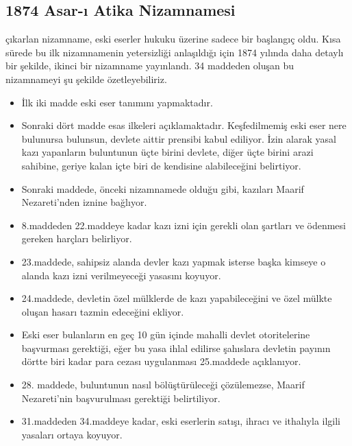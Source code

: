 \subsection{1874 Asar-ı Atika Nizamnamesi}
\indent{} çıkarlan nizamname, eski eserler hukuku üzerine sadece bir başlangıç oldu. Kısa sürede bu ilk nizamnamenin yetersizliği anlaşıldığı için 1874 yılında daha detaylı bir şekilde, ikinci bir nizamname yayınlandı. 34 maddeden oluşan bu nizamnameyi şu şekilde özetleyebiliriz.\cite{mumcu_2}
\begin{itemize}
    \item İlk iki madde eski eser tanımını yapmaktadır.
    \item Sonraki dört madde esas ilkeleri açıklamaktadır. Keşfedilmemiş eski eser nere bulunursa bulunsun, devlete aittir prensibi kabul ediliyor. İzin alarak yasal kazı yapanların buluntunun üçte birini devlete, diğer üçte birini arazi sahibine, geriye kalan içte biri de kendisine alabileceğini belirtiyor.
    \item Sonraki maddede, önceki nizamnamede olduğu gibi, kazıları Maarif Nezareti'nden iznine bağlıyor.
    \item 8.maddeden 22.maddeye kadar kazı izni için gerekli olan şartları ve ödenmesi gereken harçları belirliyor.
    \item 23.maddede, sahipsiz alanda devler kazı yapmak isterse başka kimseye o alanda kazı izni verilmeyeceği yasasını koyuyor.
    \item 24.maddede, devletin özel mülklerde de kazı yapabileceğini ve özel mülkte oluşan hasarı tazmin edeceğini ekliyor.
    \item Eski eser bulanların en geç 10 gün içinde mahalli devlet otoritelerine başvurması gerektiği, eğer bu yasa ihlal edilirse şahıslara devletin payının dörtte biri kadar para cezası uygulanması 25.maddede açıklanıyor.
    \item 28. maddede, buluntunun nasıl bölüştürüleceği çözülemezse, Maarif Nezareti'nin başvurulması gerektiği belirtiliyor.
    \item 31.maddeden 34.maddeye kadar, eski eserlerin satışı, ihracı ve ithalıyla ilgili yasaları ortaya koyuyor.
\end{itemize}